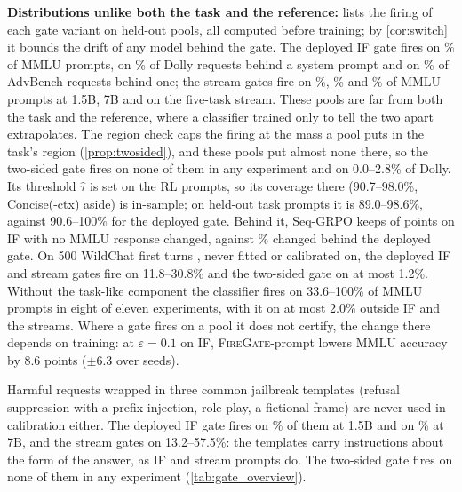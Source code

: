 \documentclass{article}
\theoremstyle{plain}
\theoremstyle{definition}
\theoremstyle{remark}
\newcommand{\methodp}{\textsc{FireGate}-prompt}
\begin{document}
\textbf{Distributions unlike both the task and the reference:}  lists the firing of each
gate variant on held-out pools, all computed before training; by \cref{cor:switch} it bounds the drift of any model
behind the gate. The deployed IF gate fires on \ovgIfcRatioAMmlu\% of MMLU prompts, on \ovgIfcRatioASys\% of Dolly
requests behind a system prompt and on \ovgIfcRatioAAdvsys\% of AdvBench requests behind one; the stream gates
fire on \ovgStreamRatioAMmlu\%, \ovgStreamsevenRatioAMmlu\% and \ovgStreamfiveRatioAMmlu\% of MMLU prompts at 1.5B, 7B
and on the five-task stream. These pools are far from both the task and the reference, where a classifier trained only
to tell the two apart extrapolates. The region check caps the firing at the mass a pool puts in the task's region
(\cref{prop:twosided}), and these pools put almost none there, so the two-sided gate fires on none of them in any
experiment and on 0.0--2.8\% of Dolly. Its threshold $\hat\tau$ is set on the RL prompts, so its coverage there
(90.7--98.0\%, Concise(-ctx) aside) is in-sample; on held-out task prompts it is 89.0--98.6\%, against 90.6--100\% for
the deployed gate. Behind it, Seq-GRPO keeps \ovwIfcSeqTwoAGain{} of \ovwIfcSeqOwnGain{} points on IF with no MMLU
response changed, against \ovwIfcSeqRatioAMmluchg\% changed behind the deployed gate. On 500 WildChat first turns
\citep{zhao2024wildchat}, never fitted or calibrated on, the deployed IF and stream gates fire on 11.8--30.8\% and the
two-sided gate on at most 1.2\%. Without the task-like component the classifier fires on 33.6--100\% of MMLU prompts in
eight of eleven experiments, with it on at most 2.0\% outside IF and the streams. Where a gate fires on a pool it does
not certify, the change there depends on training: at $\varepsilon=0.1$ on IF, \methodp{} lowers MMLU accuracy by 8.6
points ($\pm6.3$ over seeds).

Harmful requests wrapped in three common jailbreak templates (refusal suppression with a prefix injection, role play,
a fictional frame) are never used in calibration either. The deployed IF gate fires on \ovgIfcRatioAJb\% of them at
1.5B and on \ovgIfcsevenRatioAJb\% at 7B, and the stream gates on 13.2--57.5\%: the templates carry instructions
about the form of the answer, as IF and stream prompts do. The two-sided gate fires on none of them in any
experiment (\cref{tab:gate_overview}).
\end{document}
